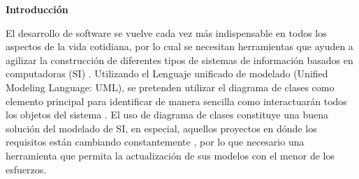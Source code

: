 \begin{center}
	\textbf{ {\titulodc Introducción}}
\end{center}

El desarrollo de software se vuelve cada vez más indispensable en todos los aspectos de la vida cotidiana, por lo cual se necesitan herramientas que ayuden a agilizar la construcción de diferentes tipos de sistemas de información basados en computadoras (SI) \cite{DeLone}. Utilizando el Lenguaje unificado de modelado (Unified Modeling Language: UML), se pretenden utilizar el diagrama de clases como elemento principal para identificar de manera sencilla como interactuarán todos los objetos del sistema \cite{UMLsequence}. El uso de diagrama de clases constituye una buena solución del modelado de SI, en especial, aquellos proyectos en dónde los requisitos están cambiando constantemente \cite{review}, por lo que necesario una herramienta que permita la actualización de sus modelos con el menor de los esfuerzos.